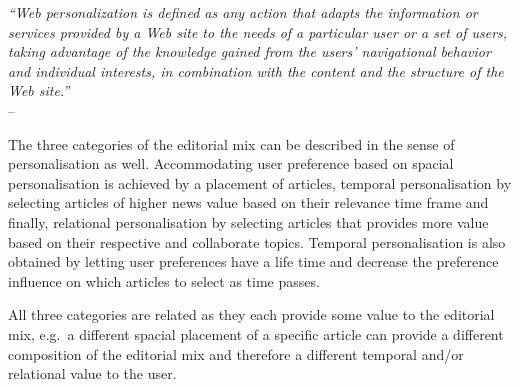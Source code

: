 \begin{minipage}{.8\largefigure}
\begin{flushleft}{\slshape
``Web personalization is defined as any action that adapts the information or services provided by a Web site to the needs of a particular user or a set of users, taking advantage of the knowledge gained from the users' navigational behavior and individual interests, in combination with the content and the structure of the Web site.''} \\ \medskip
-- \cite{MagdaliniWebMining}
\end{flushleft}
\end{minipage}
	

The three categories of the editorial mix can be described in the sense of personalisation as well. Accommodating user preference based on spacial personalisation is achieved by a placement of articles, temporal personalisation by selecting articles of higher news value based on their relevance time frame and finally, relational personalisation by selecting articles that provides more value based on their respective and collaborate topics. Temporal personalisation is also obtained by letting user preferences have a life time and decrease the preference influence on which articles to select as time passes.

All three categories are related as they each provide some value to the editorial mix, e.g.\ a different spacial placement of a specific article can provide a different composition of the editorial mix and therefore a different temporal and/or relational value to the user.

